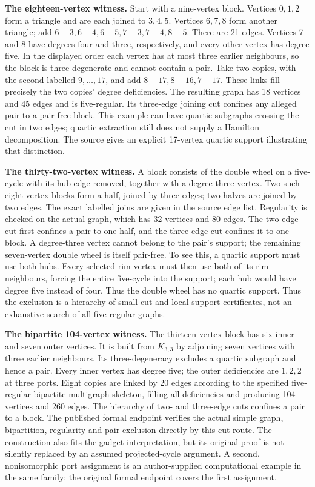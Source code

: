 \documentclass[
  11pt,
]{article}
\begin{document}
\textbf{The eighteen-vertex witness.} Start with a nine-vertex block.
Vertices \(0,1,2\) form a triangle and are each joined to \(3,4,5\).
Vertices \(6,7,8\) form another triangle; add
\(6\!-\!3,6\!-\!4,6\!-\!5,7\!-\!3,7\!-\!4,8\!-\!5\). There are 21 edges.
Vertices 7 and 8 have degrees four and three, respectively, and every
other vertex has degree five. In the displayed order each vertex has at
most three earlier neighbours, so the block is three-degenerate and
cannot contain a pair. Take two copies, with the second labelled
\(9,\ldots,17\), and add \(8\!-\!17,8\!-\!16,7\!-\!17\). These links
fill precisely the two copies' degree deficiencies. The resulting graph
has 18 vertices and 45 edges and is five-regular. Its three-edge joining
cut confines any alleged pair to a pair-free block. This example can
have quartic subgraphs crossing the cut in two edges; quartic extraction
still does not supply a Hamilton decomposition. The source gives an
explicit 17-vertex quartic support illustrating that distinction.

\textbf{The thirty-two-vertex witness.} A block consists of the double
wheel on a five-cycle with its hub edge removed, together with a
degree-three vertex. Two such eight-vertex blocks form a half, joined by
three edges; two halves are joined by two edges. The exact labelled
joins are given in the source edge list. Regularity is checked on the
actual graph, which has 32 vertices and 80 edges. The two-edge cut first
confines a pair to one half, and the three-edge cut confines it to one
block. A degree-three vertex cannot belong to the pair's support; the
remaining seven-vertex double wheel is itself pair-free. To see this, a
quartic support must use both hubs. Every selected rim vertex must then
use both of its rim neighbours, forcing the entire five-cycle into the
support; each hub would have degree five instead of four. Thus the
double wheel has no quartic support. Thus the exclusion is a hierarchy
of small-cut and local-support certificates, not an exhaustive search of
all five-regular graphs.

\textbf{The bipartite 104-vertex witness.} The thirteen-vertex block has
six inner and seven outer vertices. It is built from \(K_{3,3}\) by
adjoining seven vertices with three earlier neighbours. Its
three-degeneracy excludes a quartic subgraph and hence a pair. Every
inner vertex has degree five; the outer deficiencies are \(1,2,2\) at
three ports. Eight copies are linked by 20 edges according to the
specified five-regular bipartite multigraph skeleton, filling all
deficiencies and producing 104 vertices and 260 edges. The hierarchy of
two- and three-edge cuts confines a pair to a block. The published
formal endpoint verifies the actual simple graph, bipartition,
regularity and pair exclusion directly by this cut route. The
construction also fits the gadget interpretation, but its original proof
is not silently replaced by an assumed projected-cycle argument. A
second, nonisomorphic port assignment is an author-supplied
computational example in the same family; the original formal endpoint
covers the first assignment.
\end{document}
